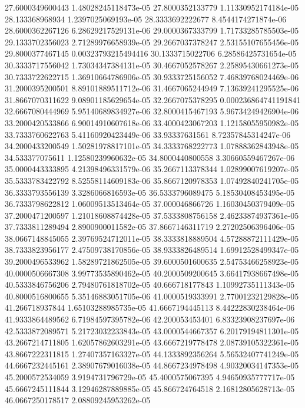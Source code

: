 {27.6000349600443 1.48028245118473e-05
27.8000352133779 1.11330952174184e-05
28.133368968934 1.2397025069193e-05
28.3333692222677 8.4544174271874e-06
28.6000362267126 6.28629217529131e-06
29.0000367333799 1.71733285785503e-05
29.1333702356023 2.71289976658939e-05
29.2667037378247 2.53155107655456e-05
29.8000377467145 0.00323793215494416
30.1333715022706 6.28586425731654e-05
30.3333717556042 1.73034347384131e-05
30.4667052578267 2.25895430661273e-05
30.7333722622715 1.36910664786906e-05
30.9333725156052 7.46839768024469e-06
31.2000395200501 8.89101889511712e-06
31.4667065244949 7.13639241295525e-06
31.8667070311622 9.08901185629654e-05
32.2667075378295 0.000236864741191841
32.6667080444969 5.95140689834927e-06
32.8000415467193 5.96734249426904e-06
33.2000420533866 6.90014910607618e-06
33.4000423067203 1.12158055950982e-05
33.7333760622763 5.41160920423449e-06
33.93337631561 8.72357845314247e-06
34.2000433200549 1.50281978817101e-05
34.3333768222773 1.07888362843948e-05
34.533377075611 1.12580239960632e-05
34.8000440800558 3.30660559467267e-06
35.0000443333895 4.21398496331579e-06
35.2667113378344 1.02899007619207e-05
35.5333783422792 8.52558114609183e-06
35.8667120978353 1.07492840241705e-05
36.3333793556139 3.3286066816593e-05
36.5333796089475 5.18530408453495e-05
36.7333798622812 1.06009513513464e-05
37.000046866726 1.16030450379409e-05
37.2000471200597 1.21018608874428e-05
37.5333808756158 2.46233874937361e-05
37.7333811289494 2.8900900011582e-05
37.8667146311719 2.27202506396406e-05
38.0667148845055 2.39769524712011e-05
38.3333818889504 4.57288872111429e-05
38.7333823956177 2.47509738170856e-05
38.9333826489514 1.69912528499347e-05
39.2000496533962 1.58289721862505e-05
39.6000501600635 2.54753466258923e-05
40.0000506667308 3.99773535890462e-05
40.2000509200645 3.66417938667498e-05
40.5333846756206 2.79480761818702e-05
40.666718177843 1.10992735111343e-05
40.8000516800655 5.35146883051705e-06
41.0000519333991 2.77001232129828e-05
41.266718937844 1.65103288985735e-05
41.6667194445113 8.44222830238464e-06
41.9333864489562 6.71984597395782e-06
42.200053453401 6.83323908237697e-06
42.5333872089571 5.21723032233843e-05
43.0000544667357 6.20179194811301e-05
43.2667214711805 1.62057862603291e-05
43.6667219778478 2.08739105322361e-05
43.8667222311815 1.27407357163327e-05
44.1333892356264 5.56532407741249e-05
44.6667232445161 2.38907679016038e-05
44.8667234978498 4.90320034147353e-05
45.2000572534059 3.9194731796729e-05
45.4000575067395 4.94650935777717e-05
45.6667245111844 3.12946287889885e-05
45.866724764518 2.16812805628713e-05
46.0667250178517 2.08809245953262e-05
}
